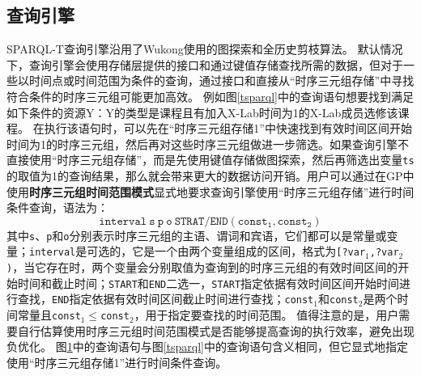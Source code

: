 \subsection{查询引擎}
SPARQL-T查询引擎沿用了Wukong使用的图探索和全历史剪枝算法。
默认情况下，查询引擎会使用存储层提供的接口和通过键值存储查找所需的数据，但对于一些以时间点或时间范围为条件的查询，通过接口和直接从“时序三元组存储”中寻找符合条件的时序三元组可能更加高效。
例如图\ref{tsparql}中的查询语句想要找到满足如下条件的资源Y：Y的类型是课程且有加入X-Lab时间为1的X-Lab成员选修该课程。
在执行该语句时，可以先在“时序三元组存储1”中快速找到有效时间区间开始时间为1的时序三元组，然后再对这些时序三元组做进一步筛选。如果查询引擎不直接使用“时序三元组存储”，而是先使用键值存储做图探索，然后再筛选出变量\texttt{ts}的取值为1的查询结果，那么就会带来更大的数据访问开销。用户可以通过在GP中使用\textbf{时序三元组时间范围模式}显式地要求查询引擎使用“时序三元组存储”进行时间条件查询，语法为：
\begin{equation}
    \mathtt{interval \ s \ p \ o \ STRAT/END(const_1, const_2)}
\end{equation}
其中\texttt{s}、\texttt{p}和\texttt{o}分别表示时序三元组的主语、谓词和宾语，它们都可以是常量或变量；\texttt{interval}是可选的，它是一个由两个变量组成的区间，格式为\texttt{[?var$_1$,?var$_2$)}，当它存在时，两个变量会分别取值为查询到的时序三元组的有效时间区间的开始时间和截止时间；\texttt{START}和\texttt{END}二选一，\texttt{START}指定依据有效时间区间开始时间进行查找，\texttt{END}指定依据有效时间区间截止时间进行查找；\texttt{const$_1$}和\texttt{const$_2$}是两个时间常量且\texttt{const$_1\leq$const$_2$}，用于指定要查找的时间范围。
值得注意的是，用户需要自行估算使用时序三元组时间范围模式是否能够提高查询的执行效率，避免出现负优化。
图\ref{trp}中的查询语句与图\ref{tsparql}中的查询语句含义相同，但它显式地指定使用“时序三元组存储1”进行时间条件查询。

\begin{figure}[!htb]
\label{trp}
\end{figure}

